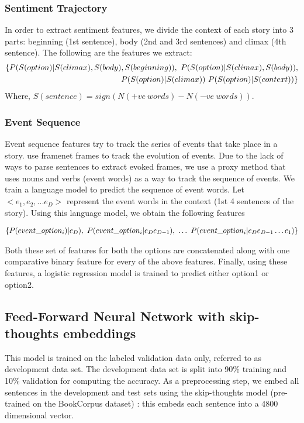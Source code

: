 \documentclass{article}
\begin{document}
\subsubsection{Sentiment Trajectory}
In order to extract sentiment features, we divide the context of each story into 3 parts: beginning (1st sentence), body (2nd and 3rd sentences) and climax (4th sentence). The following are the features we extract:
\begin{align}
    \{P(S(option)| S(climax), S(body), S(beginning)),\ P(S(option)| S(climax), S(body)), \notag\\ P(S(option)| S(climax))\ 
    P(S(option)| S(context))\}\notag
\end{align}
Where, $S(sentence) = sign(N(+ve\ words) - N(-ve\ words))$.

\subsubsection{Event Sequence}
Event sequence features try to track the series of events that take place in a story. \cite{hcm} use framenet frames to track the evolution of events. Due to the lack of ways to parse sentences to extract evoked frames, we use a proxy method that uses nouns and verbs (event words) as a way to track the sequence of events. We train a language model to predict the sequence of event words. Let $<e_1, e_2, ... e_D>$ represent the event words in the context (1st 4 sentences of the story). Using this language model, we obtain the following features

\begin{align}
\{P(event\_option_i)| e_D), \ 
P(event\_option_i| e_D e_{D-1}),\  \hdots \ P(event\_option_i| e_D e_{D-1}\hdots e_1)\}\notag
\end{align}

Both these set of features for both the options are concatenated along with one comparative binary feature for every of the above features. Finally, using these features, a logistic regression model is trained to predict either option1 or option2.

\subsection{Feed-Forward Neural Network with skip-thoughts embeddings}
This model is trained on the labeled validation data only, referred to as development data set. The development data set is split into 90\% training and 10\% validation for computing the accuracy. As a preprocessing step, we embed all sentences in the development and test sets using the skip-thoughts model (pre-trained on the BookCorpus dataset) \cite{skipthoughts}: this embeds each sentence into a 4800 dimensional vector.
\end{document}
